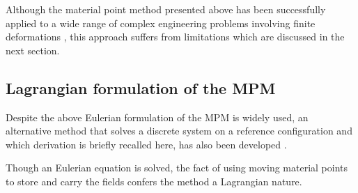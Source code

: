 Although the material point method presented above has been successfully applied to a wide range of complex engineering problems involving finite deformations \cite{Wieckowski}, this approach suffers from limitations which are discussed in the next section. 
\subsection{Lagrangian formulation of the MPM}
Despite the above Eulerian formulation of the MPM is widely used, an alternative method that solves a discrete system on a reference configuration and which derivation is briefly recalled here, has also been developed \cite{Love}.

Though an Eulerian equation is solved, the fact of using moving material points to store and carry the fields confers the method a Lagrangian nature.
